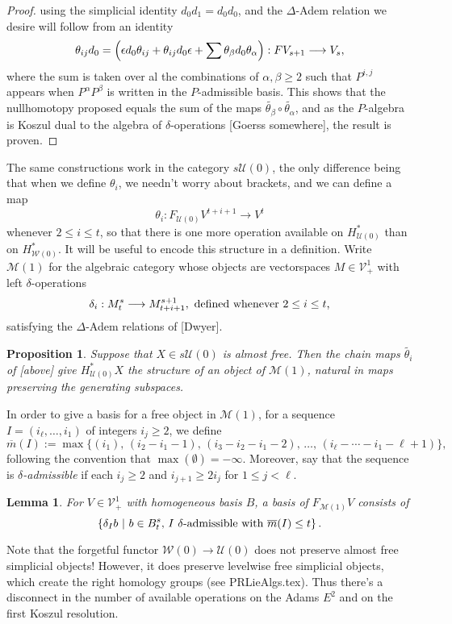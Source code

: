 \documentclass[11pt]{amsart}
\theoremstyle{plain}
\newtheorem{lem}[thm]{Lemma}
\newtheorem{prop}[thm]{Proposition}
\theoremstyle{definition}
\renewcommand{\to}{\longrightarrow}
\newcommand{\calW}{\mathcal{W}}
\newcommand{\calU}{\mathcal{U}}
\newcommand{\calV}{\mathcal{V}}
\newcommand{\calM}{\mathcal{M}}
\theoremstyle{plain}
\newcommand{\deltaalg}{\Delta} %
\newcommand{\vect}[2]{\calV^{#1}_{#2}}
\newcommand{\minDimP}{\overline{m}}
\begin{document}
\begin{Cohomology operations for all unstable Lie algebras}
\begin{proof}
using the simplicial identity $d_0d_1=d_0d_0$, and the $\deltaalg$-Adem relation we desire will follow from an identity
\[\theta_{ij}d_0=\Bigl(\epsilon d_0\theta_{ij}+\theta_{ij}d_0\epsilon+\sum\theta_\beta d_0\theta_\alpha\Bigr):FV_{s+1}\to V_s,\]
where the sum is taken over al the combinations of $\alpha,\beta\geq2$ such that $P^{i,j}$ appears when $P^\alpha P^\beta$ is written in the $P$-admissible basis. This shows that the nullhomotopy proposed equals the sum of the maps $\widetilde{\theta_\beta}\circ\widetilde{\theta_\alpha}$, and as the $P$-algebra is Koszul dual to the algebra of $\delta$-operations [Goerss somewhere], the result is proven.
\end{proof}
The same constructions work in the category $s\calU(0)$, the only difference being that when we define $\theta_i$, we needn't worry about brackets, and we can define a map
\[\theta_i:F_{\calU(0)}V^{t+i+1}\to V^t\]
whenever $2\leq i\leq t$, so that there is one more operation available on $H^*_{\calU(0)}$ than on $H^*_{\calW(0)}$. It will be useful to encode this structure in a definition. Write $\calM(1)$ for the algebraic category whose objects are vectorspaces $M\in\vect{1}{+}$ with left $\delta$-operations
\[\delta_i:M^{s}_t\to M^{s+1}_{t+i+1},\textup{ defined whenever $2\leq i\leq t$,}\]
satisfying the $\deltaalg$-Adem relations of [Dwyer].
\begin{prop}\label{operations on untable P homology}
Suppose that $X\in s\calU(0)$ is almost free. Then the chain maps $\widetilde{\theta_i}$ of [above] give $H^*_{\calU(0)}X$ the structure of an object of $\calM(1)$, natural in maps preserving the generating subspaces.
\end{prop}
In order to give a basis for a free object in $\calM(1)$, for a sequence $I=(i_\ell,\ldots,i_1)$ of integers $i_j\geq2$, we define
\[\minDimP(I):=\max\{(i_1),\,(i_2-i_1-1),\,(i_3-i_2-i_1-2),\,\ldots,\,(i_{\ell}-\cdots-i_1-\ell+1)\},
\]
following the convention that $\max(\emptyset)=-\infty$. Moreover, say that the sequence is \emph{$\delta$-admissible} if each $i_j\geq2$ and  $i_{j+1}\geq 2i_j$ for $1\leq j <\ell$.
\begin{lem}\label{basis of element of M(0)}
For $V\in\vect{1}{+}$ with homogeneous basis $B$, a basis of $F_{\calM(1)}V$ consists of
\[\left\{\delta_Ib\ \middle|\ b\in B^{s}_t\textup{, $I$ $\delta$-admissible with }\minDimP(I)\leq t\right\}.\]
\end{lem}
\begin{shaded}
Note that the forgetful functor $\calW(0)\to\calU(0)$ does not preserve almost free simplicial objects! However, it does preserve levelwise free simplicial objects, which create the right homology groups (see PRLieAlgs.tex). Thus there's a disconnect in the number of available operations on the Adams $E^2$ and on the first Koszul resolution.
\end{shaded}


\end{Cohomology operations for all unstable Lie algebras}
\end{document}
